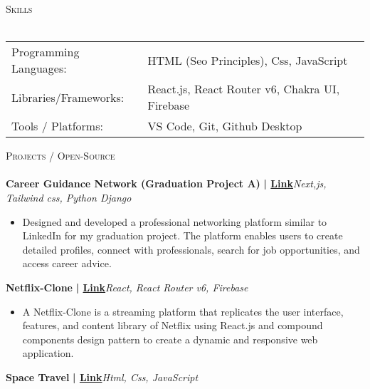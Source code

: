 \documentclass[a4paper]{article}
\newcommand{\lineunder} {
    \vspace*{-8pt} \\
    \hspace*{-18pt} \hrulefill \\
}
\newcommand{\header} [1] {
    {\hspace*{-18pt}\vspace*{6pt} \textsc{#1}}
    \vspace*{-6pt} \lineunder
}
\begin{document}
%
%
  \header{Skills}
  \vspace{2mm}
  \begin{longtable}{p{4cm}p{12cm}}
  Programming Languages: & HTML (Seo Principles), Css, JavaScript \\
  Libraries/Frameworks: & React.js, React Router v6, Chakra UI, Firebase \\
  Tools / Platforms: & VS Code, Git, Github Desktop \\
  \end{longtable}
  \vspace{1mm}

      \header{Projects / Open-Source}
      \vspace{2mm}
      {\textbf{Career Guidance Network (Graduation Project A)}}\textbf{ | \href{https://github.com/AbdelrahmanMostafa0/career-guidance-network}{Link}}\hfill{\sl Next,js, Tailwind css, Python Django}\\
          \vspace{-3mm}
\begin{itemize} \itemsep -3pt
\item[] Designed and developed a professional networking platform similar to LinkedIn for my graduation project. The platform enables users to create detailed profiles, connect with professionals, search for job opportunities, and access career advice.
\end{itemize}
          \vspace*{3mm}
      {\textbf{Netflix-Clone}}\textbf{ | \href{https://singular-malabi-8ac66d.netlify.app/}{Link}}\hfill{\sl React, React Router v6, Firebase}\\
          \vspace{-3mm}
\begin{itemize} \itemsep -3pt
\item[] A Netflix-Clone is a streaming platform that replicates the user interface, features, and content library of Netflix using React.js and compound components design pattern to create a dynamic and responsive web application.
\end{itemize}
          \vspace*{3mm}
      {\textbf{Space Travel}}\textbf{ | \href{https://clinquant-manatee-63dd3b.netlify.app/}{Link}}\hfill{\sl Html, Css, JavaScript}\\
          \vspace{-3mm}
\end{document}
